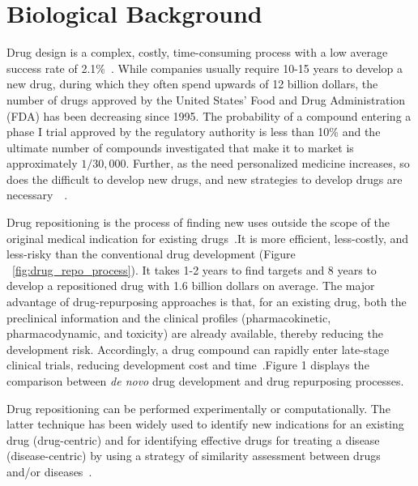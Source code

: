\chapter{Biological Background}
\label{ch:biological}

Drug design is a complex, costly, time-consuming process with a low average success rate of 2.1\%~\cite{hay_clinical_2014}. While companies usually require 10-15 years to develop a new drug, during which they often spend upwards of 12 billion dollars, the number of drugs approved by the United States' Food and Drug Administration (FDA) has been decreasing since 1995. The probability of a compound entering a phase I trial approved by the regulatory authority is less than 10\% and the ultimate number of compounds investigated that make it to market is approximately $1/30,000$. Further, as the need personalized medicine increases, so does the difficult to develop new drugs, and new strategies to develop drugs are necessary~\cite{hay_clinical_2014}~\cite{ashburn_drug_2004}.

Drug repositioning is the process of finding new uses outside the scope of the original medical indication for existing drugs~\cite{ashburn_drug_2004}.It is more efficient, less-costly, and less-risky than the conventional drug development (Figure ~\ref{fig:drug_repo_process}). It takes 1-2 years to find targets and 8 years to develop a repositioned drug with 1.6 billion dollars on average. The major advantage of drug-repurposing approaches is that, for an existing drug, both the preclinical information and the clinical profiles (pharmacokinetic, pharmacodynamic, and toxicity) are already available, thereby reducing the development risk. Accordingly, a drug compound can rapidly enter late-stage clinical trials, reducing development cost and time~\cite{novac_challenges_2013}.Figure 1 displays the comparison between \textit{de novo} drug development and drug repurposing processes.

Drug repositioning can be performed experimentally or computationally. The latter technique has been widely used to identify new indications for an existing drug (drug-centric) and for identifying effective drugs for treating a disease (disease-centric) by using a strategy of similarity assessment between drugs and/or diseases~\cite{park_review_2019}.

